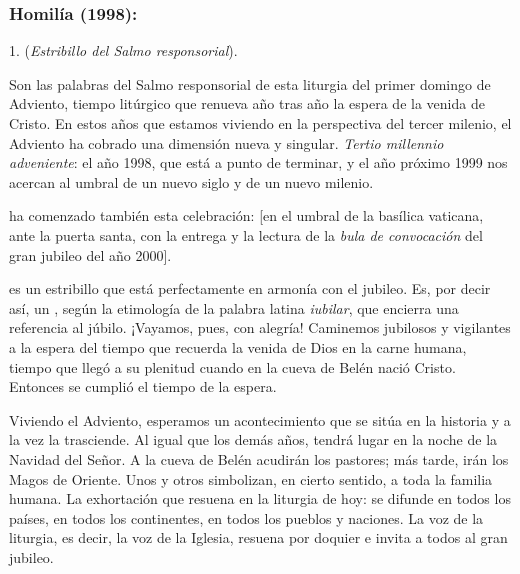			\subsubsection{Homilía (1998): }
			
			
			\begin{body}
				1.  (\emph{Estribillo del Salmo responsorial}). 
				
				Son las palabras del Salmo responsorial de esta liturgia del primer domingo de Adviento, tiempo litúrgico que renueva año tras año la espera de la venida de Cristo. En estos años que estamos viviendo en la perspectiva del tercer milenio, el Adviento ha cobrado una dimensión nueva y singular. \emph{Tertio millennio adveniente}: el año 1998, que está a punto de terminar, y el año próximo 1999 nos acercan al umbral de un nuevo siglo y de un nuevo milenio. 
				
				 ha comenzado también esta celebración: {[}en el umbral de la basílica vaticana, ante la puerta santa, con la entrega y la lectura de la \emph{bula de convocación} del gran jubileo del año 2000{]}. 
				
				 es un estribillo que está perfectamente en armonía con el jubileo. Es, por decir así, un , según la etimología de la palabra latina \emph{iubilar}, que encierra una referencia al júbilo. ¡Vayamos, pues, con alegría! Caminemos jubilosos y vigilantes a la espera del tiempo que recuerda la venida de Dios en la carne humana, tiempo que llegó a su plenitud cuando en la cueva de Belén nació Cristo. Entonces se cumplió el tiempo de la espera. 
				
				Viviendo el Adviento, esperamos un acontecimiento que se sitúa en la historia y a la vez la trasciende. Al igual que los demás años, tendrá lugar en la noche de la Navidad del Señor. A la cueva de Belén acudirán los pastores; más tarde, irán los Magos de Oriente. Unos y otros simbolizan, en cierto sentido, a toda la familia humana. La exhortación que resuena en la liturgia de hoy:  se difunde en todos los países, en todos los continentes, en todos los pueblos y naciones. La voz de la liturgia, es decir, la voz de la Iglesia, resuena por doquier e invita a todos al gran jubileo. 
				

\end{body}
